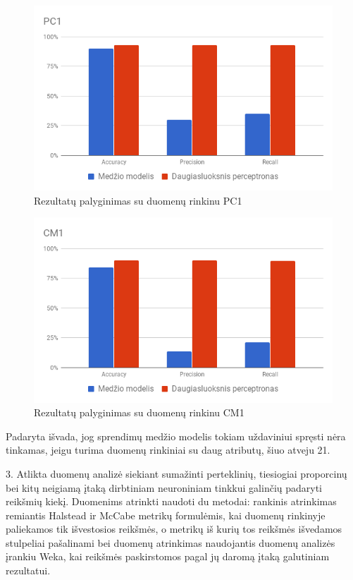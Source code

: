 \documentclass{VUMIFPSbakalaurinis}
\begin{document}
\begin{figure}[H]
    \centering
    \includegraphics[scale=0.5]{img/chart}
    \caption{Rezultatų palyginimas su duomenų rinkinu PC1}
    \label{img:chart}
\end{figure}

\begin{figure}[H]
    \centering
    \includegraphics[scale=0.5]{img/chart-2}
    \caption{Rezultatų palyginimas su duomenų rinkinu CM1}
    \label{img:chart2}
\end{figure}

Padaryta išvada, jog sprendimų medžio modelis tokiam uždaviniui spręsti nėra tinkamas, jeigu turima duomenų rinkiniai su daug atributų, šiuo atveju 21.

3. Atlikta duomenų analizė siekiant sumažinti perteklinių, tiesiogiai proporcinų bei kitų neigiamą įtaką dirbtiniam neuroniniam tinkkui galinčių padaryti reikšmių kiekį. Duomenims atrinkti naudoti du metodai: rankinis atrinkimas remiantis Halstead ir McCabe metrikų formulėmis, kai duomenų rinkinyje paliekamos tik išvestosios reikšmės, o metrikų iš kurių tos reikšmės išvedamos stulpeliai pašalinami bei duomenų atrinkimas naudojantis duomenų analizės įrankiu Weka, kai reikšmės paskirstomos pagal jų daromą įtaką galutiniam rezultatui.
\end{document}
